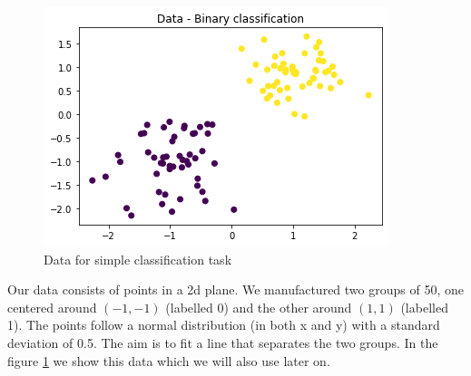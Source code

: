 \documentclass[review]{siamart190516}
\begin{document}
\begin{figure}
\includegraphics[scale=0.5]{Images/data1.png}
\caption{Data for simple classification task}
\label{fig:data}
\end{figure}

Our data consists of points in a 2d plane. We manufactured two groups of 50, one centered around $(-1,-1)$ (labelled 0) and the other around $(1,1)$ (labelled 1). The points follow a normal distribution (in both x and y) with a standard deviation of 0.5. The aim is to fit a line that separates the two groups. In the figure \ref{fig:data} we show this data which we will also use later on.
\end{document}
